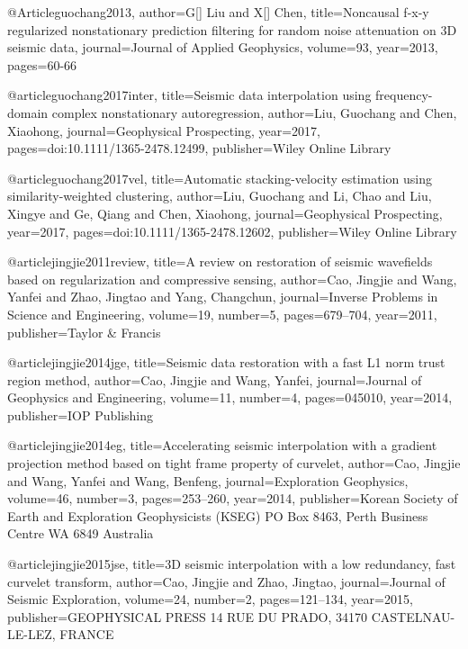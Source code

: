 @Article{guochang2013,
author={G[] Liu and X[] Chen},
title={Noncausal f-x-y regularized nonstationary prediction filtering for random noise attenuation on 3{D} seismic data},
journal={Journal of Applied Geophysics},
volume=93,
year=2013,
pages={60-66}
}

@article{guochang2017inter,
  title={Seismic data interpolation using frequency-domain complex nonstationary autoregression},
  author={Liu, Guochang and Chen, Xiaohong},
  journal={Geophysical Prospecting},
  year={2017},
  pages={doi:10.1111/1365-2478.12499},
  publisher={Wiley Online Library}
}

@article{guochang2017vel,
  title={Automatic stacking-velocity estimation using similarity-weighted clustering},
  author={Liu, Guochang and Li, Chao and Liu, Xingye and Ge, Qiang and Chen, Xiaohong},
  journal={Geophysical Prospecting},
  year={2017},
  pages={doi:10.1111/1365-2478.12602},
  publisher={Wiley Online Library}
}

@article{jingjie2011review,
  title={A review on restoration of seismic wavefields based on regularization and compressive sensing},
  author={Cao, Jingjie and Wang, Yanfei and Zhao, Jingtao and Yang, Changchun},
  journal={Inverse Problems in Science and Engineering},
  volume={19},
  number={5},
  pages={679--704},
  year={2011},
  publisher={Taylor \& Francis}
}

@article{jingjie2014jge,
  title={Seismic data restoration with a fast L1 norm trust region method},
  author={Cao, Jingjie and Wang, Yanfei},
  journal={Journal of Geophysics and Engineering},
  volume={11},
  number={4},
  pages={045010},
  year={2014},
  publisher={IOP Publishing}
}

@article{jingjie2014eg,
  title={Accelerating seismic interpolation with a gradient projection method based on tight frame property of curvelet},
  author={Cao, Jingjie and Wang, Yanfei and Wang, Benfeng},
  journal={Exploration Geophysics},
  volume={46},
  number={3},
  pages={253--260},
  year={2014},
  publisher={Korean Society of Earth and Exploration Geophysicists (KSEG) PO Box 8463, Perth Business Centre WA 6849 Australia}
}

@article{jingjie2015jse,
  title={3{D} seismic interpolation with a low redundancy, fast curvelet transform},
  author={Cao, Jingjie and Zhao, Jingtao},
  journal={Journal of Seismic Exploration},
  volume={24},
  number={2},
  pages={121--134},
  year={2015},
  publisher={GEOPHYSICAL PRESS 14 RUE DU PRADO, 34170 CASTELNAU-LE-LEZ, FRANCE}
}

